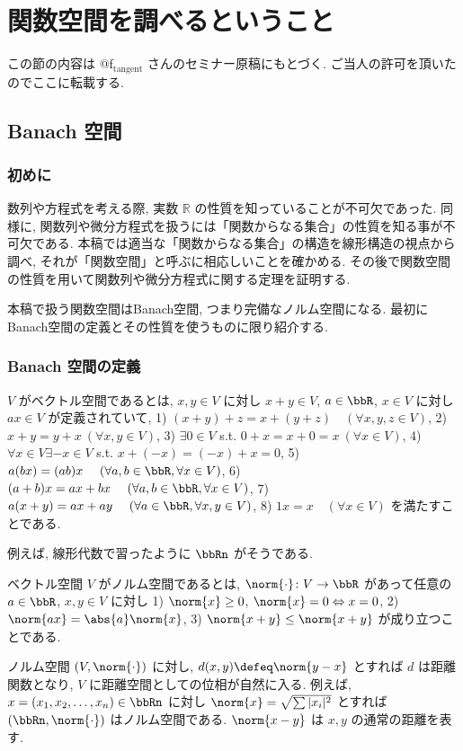 \documentclass[openany, a4paper, oneside]{jsbook}
\begin{document}
\chapter{関数空間を調べるということ}

この節の内容は @f$_{\text{tangent}}$ さんのセミナー原稿にもとづく.
ご当人の許可を頂いたのでここに転載する.
\section{Banach 空間}

\subsection{初めに}

数列や方程式を考える際, 実数 $\mathbb{R}$ の性質を知っていることが不可欠であった.
同様に, 関数列や微分方程式を扱うには「関数からなる集合」の性質を知る事が不可欠である.
本稿では適当な「関数からなる集合」の構造を線形構造の視点から調べ, それが「関数空間」と呼ぶに相応しいことを確かめる.
その後で関数空間の性質を用いて関数列や微分方程式に関する定理を証明する.

本稿で扱う関数空間はBanach空間, つまり完備なノルム空間になる.
最初にBanach空間の定義とその性質を使うものに限り紹介する.
\subsection{Banach 空間の定義}

\begin{defn}
 $V$ がベクトル空間であるとは, $x, y \in V$ に対し $x + y \in V$,
 $a \in \bbR$, $x \in V$ に対し $a x \in V$ が定義されていて,
  1) $(x + y) + z = x + (y + z) \quad (\forall x, y, z \in V)$,
  2) $x+y=y+x\ (\forall x, y\in V)$,
  3) $\exists 0 \in V$ s.t. $0+x=x+0=x\ (\forall x \in V)$,
  4) $\forall x \in V \exists -x \in V$ s.t. $x+(-x)=(-x)+x=0$,
  5) $a(bx)=(ab)x\ \quad (\forall a, b \in \bbR, \forall x \in V)$,
  6) $(a+b)x=ax+bx\ \quad (\forall a, b \in \bbR, \forall x \in V)$,
  7) $a(x+y)=ax+ay\ \quad (\forall a \in \bbR, \forall x, y\in V)$,
  8) $1x=x \quad (\forall x \in V)$
 を満たすことである.
\end{defn}
\begin{ex}
例えば, 線形代数で習ったように $\bbRn$ がそうである.
\end{ex}
\begin{defn}
 ベクトル空間 $V$ がノルム空間であるとは, $\norm{\cdot} \colon V \to \bbR$ があって任意の $a \in \bbR$, $x, y\in V$ に対し
  1) $\norm{x} \geq0$, $\norm{x} = 0 \Leftrightarrow x = 0$,
  2) $\norm{ax} = \abs{a} \norm{x}$,
  3) $\norm{x + y} \leq \norm{x + y}$
 が成り立つことである.
\end{defn}
\begin{rem}
ノルム空間 $(V, \norm{\cdot})$ に対し, $d(x, y) \defeq \norm{y - x}$ とすれば $d$ は距離関数となり,
$V$ に距離空間としての位相が自然に入る.
例えば, $x=(x_1, x_2, \dots, x_n) \in \bbRn$ に対し
$\norm{x} = \sqrt{\sum |x_i|^2}$ とすれば $(\bbRn, \norm{\cdot})$ はノルム空間である.
$\norm{x - y}$ は $x, y$ の通常の距離を表す.
\end{rem}
\end{document}
